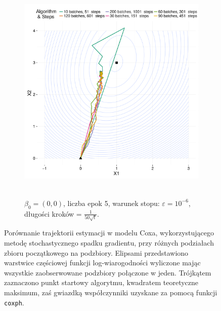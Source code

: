 \begin{figure}[hbt!]
\begin{center}
\begin{subfigure}[h!]{0.9\textwidth}
      \includegraphics[width=\textwidth, height=310pt]{Obrazki/b_0_0_iter_5_e-6_50sqrt.pdf}
            \caption{$\beta_0=(0,0)$, liczba epok 5, warunek stopu: $\varepsilon=10^{-6}$, długości kroków = $\frac{1}{50\sqrt{t}}$.}
   \end{subfigure}  
      \end{center}
  \caption[Porównanie trajektorii estymacji w modelu Coxa, wykorzystującego metodę stochastycznego spadku gradientu, przy różnych podziałach zbioru początkowego na podzbiory.]{\label{rysCox}Porównanie trajektorii estymacji w modelu Coxa, wykorzystującego metodę stochastycznego spadku gradientu, przy różnych podziałach zbioru początkowego na podzbiory. Elipsami przedstawiono warstwice częściowej funkcji log-wiarogodności wyliczone mając wszystkie zaobserwowane podzbiory połączone w jeden. Trójkątem zaznaczono punkt startowy algorytmu, kwadratem teoretyczne maksimum, zaś gwiazdką współczynniki uzyskane za pomocą funkcji \texttt{coxph}.}
\end{figure}



